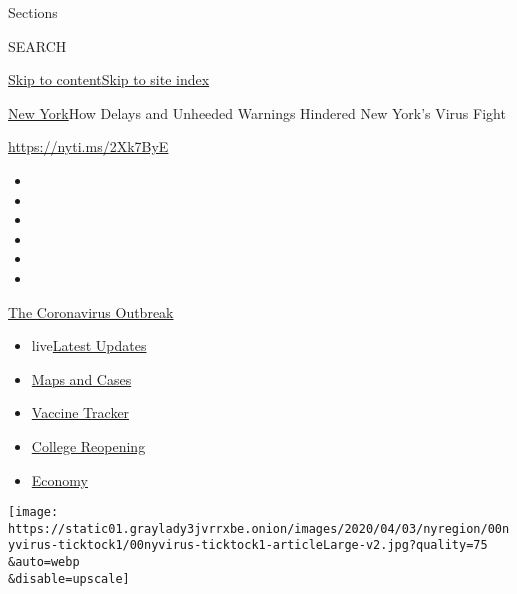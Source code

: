 Sections

SEARCH

\protect\hyperlink{site-content}{Skip to
content}\protect\hyperlink{site-index}{Skip to site index}

\href{/section/nyregion}{New York}\textbar{}How Delays and Unheeded
Warnings Hindered New York's Virus Fight

\url{https://nyti.ms/2Xk7ByE}

\begin{itemize}
\item
\item
\item
\item
\item
\item
\end{itemize}

\href{https://www.nytimes3xbfgragh.onion/news-event/coronavirus?action=click\&pgtype=Article\&state=default\&region=TOP_BANNER\&context=storylines_menu}{The
Coronavirus Outbreak}

\begin{itemize}
\tightlist
\item
  live\href{https://www.nytimes3xbfgragh.onion/2020/08/04/world/coronavirus-cases.html?action=click\&pgtype=Article\&state=default\&region=TOP_BANNER\&context=storylines_menu}{Latest
  Updates}
\item
  \href{https://www.nytimes3xbfgragh.onion/interactive/2020/us/coronavirus-us-cases.html?action=click\&pgtype=Article\&state=default\&region=TOP_BANNER\&context=storylines_menu}{Maps
  and Cases}
\item
  \href{https://www.nytimes3xbfgragh.onion/interactive/2020/science/coronavirus-vaccine-tracker.html?action=click\&pgtype=Article\&state=default\&region=TOP_BANNER\&context=storylines_menu}{Vaccine
  Tracker}
\item
  \href{https://www.nytimes3xbfgragh.onion/2020/08/02/us/covid-college-reopening.html?action=click\&pgtype=Article\&state=default\&region=TOP_BANNER\&context=storylines_menu}{College
  Reopening}
\item
  \href{https://www.nytimes3xbfgragh.onion/live/2020/08/04/business/stock-market-today-coronavirus?action=click\&pgtype=Article\&state=default\&region=TOP_BANNER\&context=storylines_menu}{Economy}
\end{itemize}

\texttt{[image: https://static01.graylady3jvrrxbe.onion/images/2020/04/03/nyregion/00nyvirus-ticktock1/00nyvirus-ticktock1-articleLarge-v2.jpg?quality=75\\\&auto=webp\\\&disable=upscale]}

